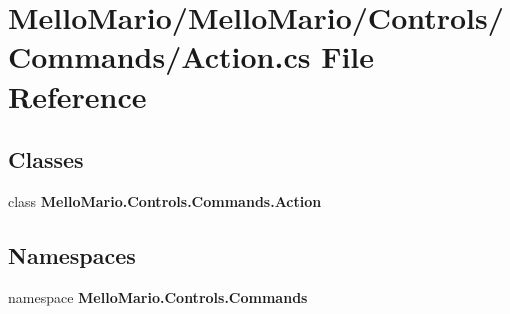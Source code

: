 \section{Mello\+Mario/\+Mello\+Mario/\+Controls/\+Commands/\+Action.cs File Reference}
\label{Action_8cs}
\subsection*{Classes}
\begin{DoxyCompactItemize}
\item 
class \textbf{ Mello\+Mario.\+Controls.\+Commands.\+Action}
\end{DoxyCompactItemize}
\subsection*{Namespaces}
\begin{DoxyCompactItemize}
\item 
namespace \textbf{ Mello\+Mario.\+Controls.\+Commands}
\end{DoxyCompactItemize}
